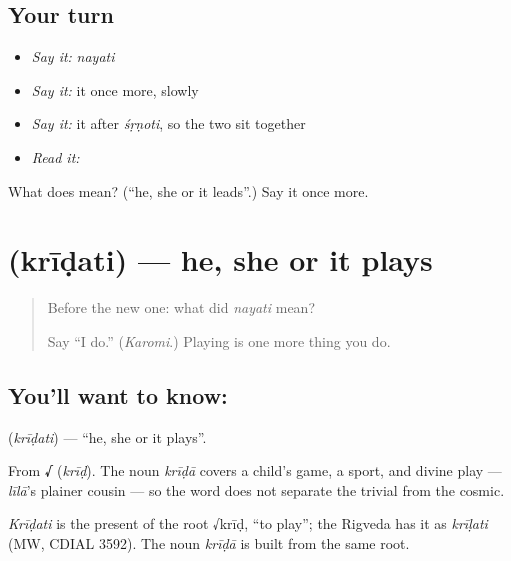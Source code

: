 \subsection*{Your turn}
\begin{itemize}
\raggedright
  \item \emph{Say it:} \emph{nayati}
  \item \emph{Say it:} it once more, slowly
  \item \emph{Say it:} it after \emph{śṛṇoti}, so the two sit together
  \item \emph{Read it:} \textbf{}
\end{itemize}

\begin{tcolorbox}[breakable,colback=teal!4,colframe=teal!35!black,title={Before you move on}]
What does  mean? (\textquotedblleft{}he, she or it leads\textquotedblright{}.) Say it once more.
\end{tcolorbox}
\section[\texorpdfstring{\sk{क्रीडति} (krīḍati)}{क्रीडति (krīḍati)}]{ (krīḍati) — he, she or it plays}

\label{lesson:SA-C22-play}



\begin{quote}
Before the new one: what did \emph{nayati} mean?

Say \textquotedblleft{}I do.\textquotedblright{} (\emph{Karomi}.) Playing is one more thing you do.
\end{quote}

\subsection*{You'll want to know: }
\textbf{} (\emph{krīḍati}) — \textquotedblleft{}he, she or it plays\textquotedblright{}.

From \textbf{√} (\emph{krīḍ}). The noun \emph{krīḍā} covers a child's game, a sport, and divine play — \emph{līlā}'s plainer cousin — so the word does not separate the trivial from the cosmic.

\begin{cousinweb}
\emph{Krīḍati} is the present of the root √krīḍ, \textquotedblleft{}to play\textquotedblright{}; the Rigveda has it as \emph{krīḷati} (MW, CDIAL 3592). The noun \emph{krīḍā} is built from the same root.
\end{cousinweb}

